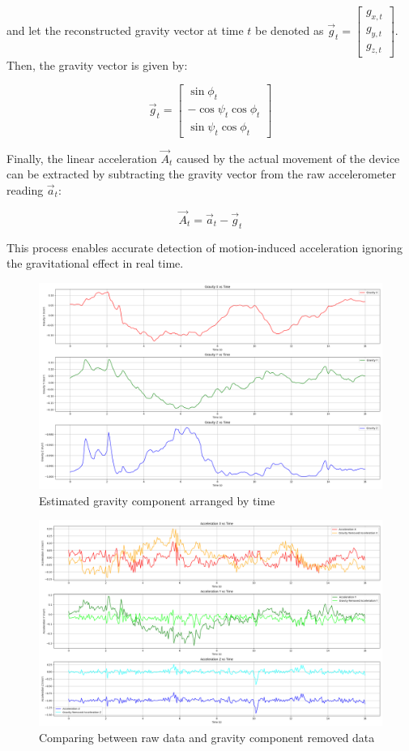 \documentclass{article}
\begin{document}
and let the reconstructed gravity vector at time $t$ be denoted as $\vec{g}_t = \begin{bmatrix} g_{x,t} \\ g_{y,t} \\ g_{z,t} \end{bmatrix}$. Then, the gravity vector is given by:

\[
\vec{g}_t =
\begin{bmatrix}
\sin\phi_t \\
-\cos\psi_t \cos\phi_t \\
\sin\psi_t \cos\phi_t
\end{bmatrix}
\]

Finally, the linear acceleration $\vec{A}_t$ caused by the actual movement of the device can be extracted by subtracting the gravity vector from the raw accelerometer reading $\vec{a}_t$:

\[
\vec{A}_t = \vec{a}_t - \vec{g}_t
\]

This process enables accurate detection of motion-induced acceleration ignoring the gravitational effect in real time.

\FloatBarrier
\begin{figure}[h]
    \centering
    \includegraphics[width=\textwidth]{2_1_5_1.png}
    \caption{Estimated gravity component arranged by time}
    \label{fig:gravity_component}
\end{figure}
\FloatBarrier
\begin{figure}[h]
    \centering
    \includegraphics[width=\textwidth]{2_1_5_2.png}
    \caption{Comparing between raw data and gravity component removed data}
    \label{fig:removal_of_gravity_component}
\end{figure}
\end{document}
